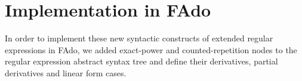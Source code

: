 









\section{Implementation in FAdo}
In order to implement these new syntactic constructs of extended regular expressions in FAdo, we added exact-power and counted-repetition nodes to the regular expression abstract syntax tree and define their derivatives, partial derivatives and linear form cases.

